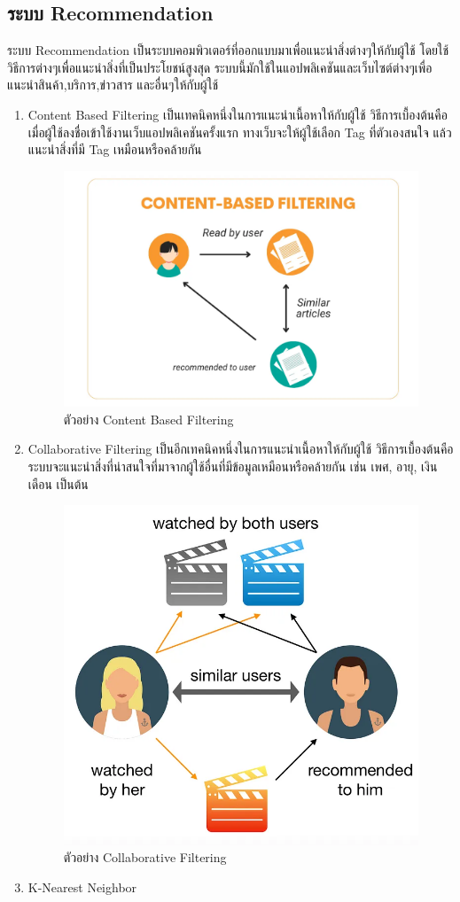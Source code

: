 \subsection{ระบบ Recommendation}
ระบบ Recommendation เป็นระบบคอมพิวเตอร์ที่ออกแบบมาเพื่อแนะนำสิ่งต่างๆให้กับผู้ใช้ โดยใช้วิธีการต่างๆเพื่อแนะนำสิ่งที่เป็นประโยชน์สูงสุด ระบบนี้มักใช้ในแอปพลิเคชันและเว็บไซต์ต่างๆเพื่อแนะนำสินค้า,บริการ,ข่าวสาร และอื่นๆให้กับผู้ใช้
\cite{recom}
\begin{enumerate}
    \item Content Based Filtering เป็นเทคนิคหนึ่งในการแนะนำเนื้อหาให้กับผู้ใช้ วิธีการเบื้องต้นคือ เมื่อผู้ใช้ลงชื่อเข้าใช้งานเว็บแอปพลิเคชันครั้งแรก ทางเว็บจะให้ผู้ใช้เลือก Tag ที่ตัวเองสนใจ แล้วแนะนำสิ่งที่มี Tag เหมือนหรือคล้ายกัน 
    \begin{figure}[h] %
        \begin{center}
        \includegraphics[width=0.6\linewidth]{image/content_base.png}
        \end{center}
        \caption[Poem]{ตัวอย่าง Content Based Filtering\cite{content_based}}
        \label{fig:content_based}
        \end{figure}
    \item Collaborative Filtering เป็นอีกเทคนิคหนึ่งในการแนะนำเนื้อหาให้กับผู้ใช้ วิธีการเบื้องต้นคือ ระบบจะแนะนำสิ่งที่น่าสนใจที่มาจากผู้ใช้อื่นที่มีข้อมูลเหมือนหรือคล้ายกัน เช่น เพศ, อายุ, เงินเดือน เป็นต้น 
    \begin{figure}[h] %
        \begin{center}
        \includegraphics[width=0.6\linewidth]{image/collaborative.png}
        \end{center}
        \caption[Poem]{ตัวอย่าง Collaborative Filtering\cite{collaborative}}
        \label{fig:collaborative_filtering}
        \end{figure}
    \item K-Nearest Neighbor
\end{enumerate}
